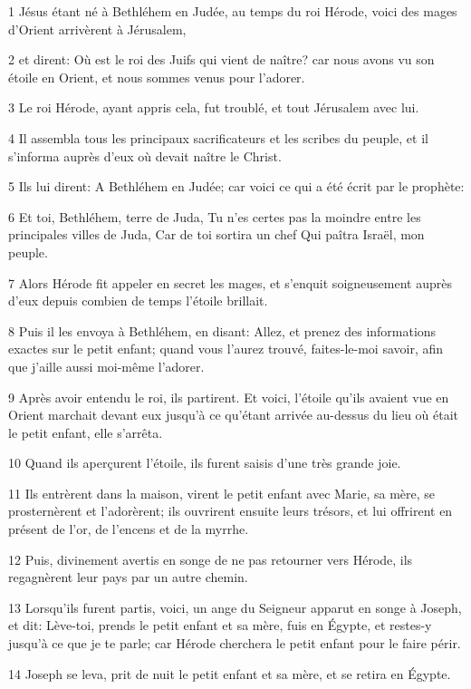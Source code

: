 \par 1 Jésus étant né à Bethléhem en Judée, au temps du roi Hérode, voici des mages d'Orient arrivèrent à Jérusalem,
\par 2 et dirent: Où est le roi des Juifs qui vient de naître? car nous avons vu son étoile en Orient, et nous sommes venus pour l'adorer.
\par 3 Le roi Hérode, ayant appris cela, fut troublé, et tout Jérusalem avec lui.
\par 4 Il assembla tous les principaux sacrificateurs et les scribes du peuple, et il s'informa auprès d'eux où devait naître le Christ.
\par 5 Ils lui dirent: A Bethléhem en Judée; car voici ce qui a été écrit par le prophète:
\par 6 Et toi, Bethléhem, terre de Juda, Tu n'es certes pas la moindre entre les principales villes de Juda, Car de toi sortira un chef Qui paîtra Israël, mon peuple.
\par 7 Alors Hérode fit appeler en secret les mages, et s'enquit soigneusement auprès d'eux depuis combien de temps l'étoile brillait.
\par 8 Puis il les envoya à Bethléhem, en disant: Allez, et prenez des informations exactes sur le petit enfant; quand vous l'aurez trouvé, faites-le-moi savoir, afin que j'aille aussi moi-même l'adorer.
\par 9 Après avoir entendu le roi, ils partirent. Et voici, l'étoile qu'ils avaient vue en Orient marchait devant eux jusqu'à ce qu'étant arrivée au-dessus du lieu où était le petit enfant, elle s'arrêta.
\par 10 Quand ils aperçurent l'étoile, ils furent saisis d'une très grande joie.
\par 11 Ils entrèrent dans la maison, virent le petit enfant avec Marie, sa mère, se prosternèrent et l'adorèrent; ils ouvrirent ensuite leurs trésors, et lui offrirent en présent de l'or, de l'encens et de la myrrhe.
\par 12 Puis, divinement avertis en songe de ne pas retourner vers Hérode, ils regagnèrent leur pays par un autre chemin.
\par 13 Lorsqu'ils furent partis, voici, un ange du Seigneur apparut en songe à Joseph, et dit: Lève-toi, prends le petit enfant et sa mère, fuis en Égypte, et restes-y jusqu'à ce que je te parle; car Hérode cherchera le petit enfant pour le faire périr.
\par 14 Joseph se leva, prit de nuit le petit enfant et sa mère, et se retira en Égypte.
